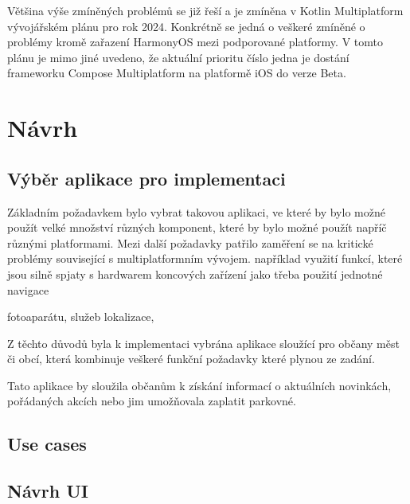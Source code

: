 Většina výše zmíněných problémů se již řeší a je zmíněna v Kotlin Multiplatform vývojářském plánu pro rok 2024. \cite{KMPRoaddMap} Konkrétně
se jedná o veškeré zmíněné o problémy kromě zařazení HarmonyOS mezi podporované platformy.%
V tomto plánu je mimo jiné uvedeno, že aktuální prioritu číslo jedna je dostání frameworku Compose Multiplatform na platformě iOS do verze Beta. \cite{KMPRoaddMap}

\chapter{Návrh}



\section{Výběr aplikace pro implementaci}
Základním požadavkem bylo vybrat takovou aplikaci, ve které by bylo možné použít velké množství různých komponent, 
které by bylo možné použít napříč různými platformami.
Mezi další požadavky patřilo zaměření se na kritické problémy související s multiplatformním vývojem. 
například využití funkcí, které jsou silně spjaty s hardwarem koncových zařízení jako třeba použití jednotné navigace

fotoaparátu, služeb lokalizace, 

Z těchto důvodů byla k implementaci vybrána aplikace sloužící pro občany měst či obcí, která kombinuje veškeré funkční
požadavky které plynou ze zadání.

Tato aplikace by sloužila občanům k získání informací o aktuálních novinkách, pořádaných akcích nebo jim umožňovala
zaplatit parkovné.


\section{Use cases}


\section{Návrh UI}


